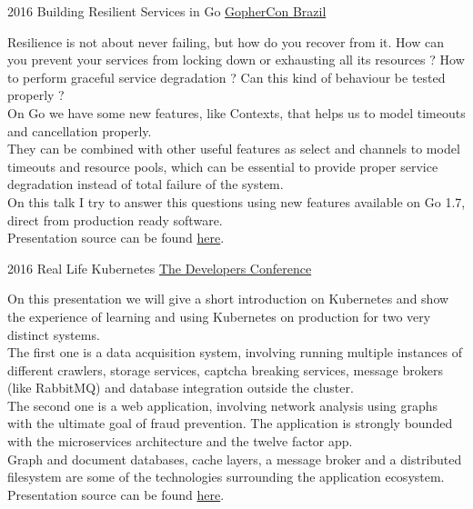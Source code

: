 \documentclass[]{friggeri-cv} %
\begin{document}
\begin{entrylist}
\entry
{2016}
{Building Resilient Services in Go}
{\href{https://2016.gopherconbr.org/en/}{GopherCon Brazil}}
{

Resilience is not about never failing, but how do you recover from it.
How can you prevent your services from locking down or exhausting all its resources ?
How to perform graceful service degradation ? Can this kind of behaviour be tested properly ?\\

On Go we have some new features, like Contexts, that helps us to model timeouts and cancellation properly.\\

They can be combined with other useful features as select and channels to model timeouts and resource pools,
which can be essential to provide proper service degradation instead of total failure of the system.\\

On this talk I try to answer this questions using new features available on Go 1.7, direct from production ready software.\\

Presentation source can be found \href{https://github.com/katcipis/my.presentations/tree/master/resilient-services-in-go}{here}.

}
\end{entrylist}

\begin{entrylist}
\entry
{2016}
{Real Life Kubernetes}
{\href{http://www.thedevelopersconference.com.br/tdc/2016/florianopolis/trilha-devops}{The Developers Conference}}
{

On this presentation we will give a short introduction on Kubernetes and show the experience of learning
and using Kubernetes on production for two very distinct systems.\\

The first one is a data acquisition system, involving running multiple instances of different crawlers,
storage services, captcha breaking services, message brokers (like RabbitMQ) and database integration outside the cluster.\\

The second one is a web application, involving network analysis using graphs with the ultimate goal of fraud prevention.
The application is strongly bounded with the microservices architecture and the twelve factor app.\\

Graph and document databases, cache layers, a message broker and a distributed filesystem are some of
the technologies surrounding the application ecosystem.\\

Presentation source can be found \href{https://github.com/katcipis/my.presentations/tree/master/real-life-kubernetes}{here}.

}
\end{entrylist}
\end{document}
